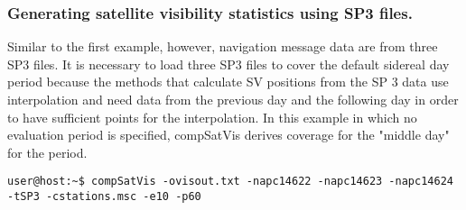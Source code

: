 \subsubsection{Generating satellite visibility statistics using SP3 files. }
Similar to the first example, however, navigation message data are from three SP3 files. It is necessary to load three SP3 files to cover the default sidereal day period because the methods that calculate SV positions from the SP 3 data use interpolation and need data from the previous day and the following day in order to have sufficient points for the interpolation. In this example in which no evaluation period is specified, compSatVis derives coverage for the "middle day" for the period. 
\begin{verbatim}
user@host:~$ compSatVis -ovisout.txt -napc14622 -napc14623 -napc14624 -tSP3 -cstations.msc -e10 -p60
\end{verbatim}

% 
